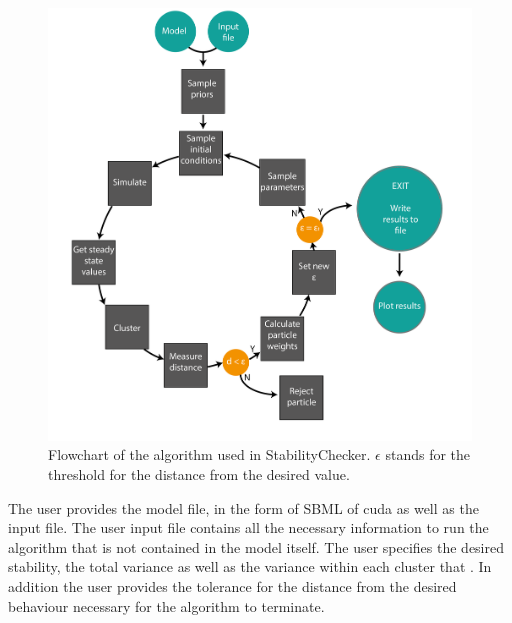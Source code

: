 \begin{figure}[ht!]
	\centering
	\includegraphics[scale=0.6]{chapterModelling/images/StabilityChecker_flowchart-01}
	\caption[Flowchart of the algorithm used in StabilityChecker]{Flowchart of the algorithm used in StabilityChecker. $\epsilon$ stands for the threshold for the distance from the desired value.}
	\label{fig:flowchart}
\end{figure}
\clearpage
 The user provides the model file, in the form of SBML of cuda as well as the input file. The user input file contains all the necessary information to run the algorithm that is not contained in the model itself. The user specifies the desired stability, the total variance as well as the variance within each cluster that . In addition the user provides the tolerance for the distance from the desired behaviour necessary for the algorithm to terminate. 

